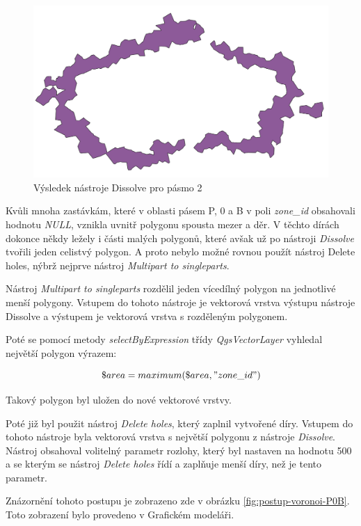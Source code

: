 \begin{figure}[H] \centering
    \includegraphics[width=400pt]{./pictures/dissolve.png}
    \caption[Výsledek nástroje Dissolve pro pásmo 2]{Výsledek nástroje Dissolve pro pásmo 2}
	\label{fig:dissolve}              
\end{figure} 

Kvůli mnoha zastávkám, které v oblasti pásem P, 0 a B v poli \textit{zone\_id} obsahovali hodnotu \textit{NULL},
vznikla uvnitř polygonu spousta mezer a děr. V těchto dírách dokonce někdy ležely i části malých polygonů, které 
avšak už po nástroji \textit{Dissolve} tvořili jeden celistvý polygon. A proto nebylo možné rovnou použít nástroj Delete holes,
nýbrž nejprve nástroj \textit{Multipart to singleparts}.

Nástroj \textit{Multipart to singleparts} rozdělil jeden vícedílný polygon na jednotlivé menší polygony. Vstupem do tohoto
nástroje je vektorová vrstva výstupu nástroje Dissolve a výstupem je vektorová vrstva s rozděleným polygonem.

Poté se pomocí metody \textit{selectByExpression} třídy \textit{QgsVectorLayer} vyhledal nej\-větší polygon
výrazem:

\[\$area = maximum(\$area, "zone\_id")\]

Takový polygon byl uložen do nové vektorové vrstvy. 

Poté již byl použit nástroj \textit{Delete holes}, který zaplnil vytvořené díry. Vstupem do tohoto nástroje byla vektorová
vrstva s největší polygonu z nástroje \textit{Dissolve}. Nástroj obsahoval volitelný parametr rozlohy, který byl
nastaven na hodnotu 500 a se kterým se nástroj \textit{Delete holes} řídí a zaplňuje menší díry, než je tento parametr.  

Znázornění tohoto postupu je zobrazeno zde v obrázku \ref{fig:postup-voronoi-P0B}. Toto zobrazení bylo provedeno v Grafickém modeláři.

